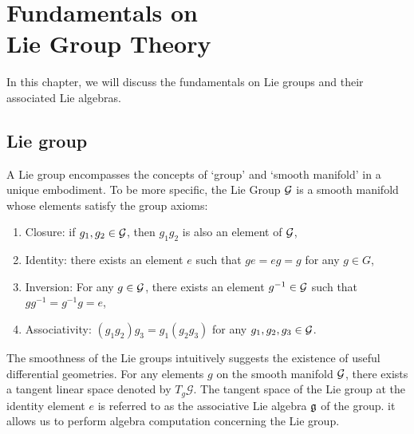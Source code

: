 \chapter{Fundamentals on \\ \vspace{5mm} Lie Group Theory}
In this chapter, we will discuss the fundamentals on Lie groups and their associated Lie algebras.

\section{Lie group}
A Lie group encompasses the concepts of `group' and `smooth manifold' in a unique embodiment. To be more specific, the Lie Group $\mathcal{G}$ is a smooth manifold whose elements satisfy the group axioms:
\begin{enumerate}
\item Closure: if $g_1,g_2 \in \mathcal{G}$, then $g_1g_2$ is also an element of $\mathcal{G}$,
\item Identity: there exists an element $e$ such that $g e = e g = g$ for any $g \in G$,
\item Inversion: For any $g \in \mathcal{G}$, there exists an element $g^{-1} \in \mathcal{G}$ such that $g g^{-1} = g^{-1}g = e$,
\item Associativity: $(g_1 g_2) g_3 = g_1 (g_2 g_3)$ for any $g_1,g_2,g_3 \in \mathcal{G}$.
\end{enumerate}

The smoothness of the Lie groups intuitively suggests the existence of useful differential geometries. For any elements $g$ on the smooth manifold $\mathcal{G}$, there exists a tangent linear space denoted by $T_{g} \mathcal{G}$. The tangent space of the Lie group at the identity element $e$ is referred to as the associative Lie algebra $\mathfrak{g}$ of the group. it allows us to perform algebra computation concerning the Lie group.
